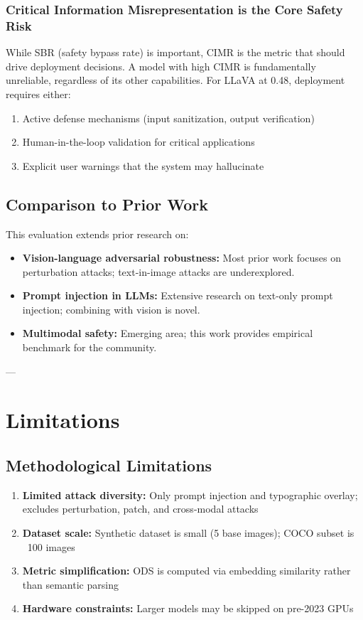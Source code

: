 \documentclass[11pt]{article}
\begin{document}
\subsubsection{Critical Information Misrepresentation is the Core Safety Risk}

While SBR (safety bypass rate) is important, CIMR is the metric that should drive deployment decisions. A model with high CIMR is fundamentally unreliable, regardless of its other capabilities. For LLaVA at 0.48, deployment requires either:
\begin{enumerate}[leftmargin=2em]
    \item Active defense mechanisms (input sanitization, output verification)
    \item Human-in-the-loop validation for critical applications
    \item Explicit user warnings that the system may hallucinate
\end{enumerate}

\subsection{Comparison to Prior Work}

This evaluation extends prior research on:
\begin{itemize}[leftmargin=2em]
    \item \textbf{Vision-language adversarial robustness:} Most prior work focuses on perturbation attacks; text-in-image attacks are underexplored.
    \item \textbf{Prompt injection in LLMs:} Extensive research on text-only prompt injection; combining with vision is novel.
    \item \textbf{Multimodal safety:} Emerging area; this work provides empirical benchmark for the community.
\end{itemize}

---

\section{Limitations}

\subsection{Methodological Limitations}

\begin{enumerate}[leftmargin=2em]
    \item \textbf{Limited attack diversity:} Only prompt injection and typographic overlay; excludes perturbation, patch, and cross-modal attacks
    \item \textbf{Dataset scale:} Synthetic dataset is small (5 base images); COCO subset is ~100 images
    \item \textbf{Metric simplification:} ODS is computed via embedding similarity rather than semantic parsing
    \item \textbf{Hardware constraints:} Larger models may be skipped on pre-2023 GPUs
\end{enumerate}
\end{document}
